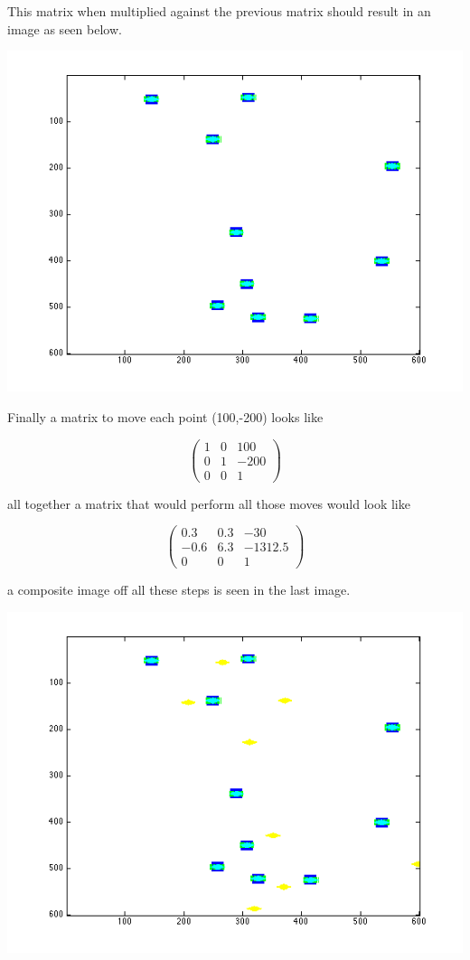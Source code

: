 \documentclass[a4paper,12pt]{article}
\begin{document}
 This matrix when multiplied against the previous matrix should result in an image as seen below.

\includegraphics[scale=.5]{q3_2.png}

Finally a matrix to move each point (100,-200) looks like

\[ \left ( \begin{array}{ccc}
1 & 0 & 100\\
0 & 1 & -200\\
0 & 0 & 1\end{array} \right ) \]

all together a  matrix that would perform all those moves would look like

\[ \left ( \begin{array}{ccc}
0.3 & 0.3 & -30\\
-0.6 & 6.3 & -1312.5\\
0 & 0 & 1 \end{array} \right ) \]

a composite image off all these steps is seen in the last image.

\includegraphics[scale=.5]{q3_3.png}
\end{document}
